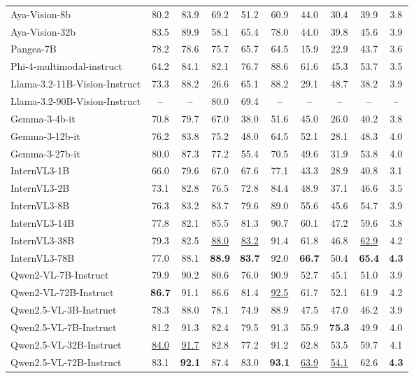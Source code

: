 \begin{table*}[t]
\begin{adjustbox}{max width=\linewidth}
\begin{tabular}{lccccccccc}
Aya-Vision-8b & 80.2 & 83.9 & 69.2 & 51.2 & 60.9 & 44.0 & 30.4 & 39.9 & 3.8 \\
Aya-Vision-32b & 83.5 & 89.9 & 58.1 & 65.4 & 78.0 & 44.0 & 39.8 & 45.6 & 3.9 \\
Pangea-7B & 78.2 & 78.6 & 75.7 & 65.7 & 64.5 & 15.9 & 22.9 & 43.7 & 3.6 \\
Phi-4-multimodal-instruct & 64.2 & 84.1 & 82.1 & 76.7 & 88.6 & 61.6 & 45.3 & 53.7 & 3.5 \\
Llama-3.2-11B-Vision-Instruct & 73.3 & 88.2 & 26.6 & 65.1 & 88.2 & 29.1 & 48.7 & 38.2 & 3.9 \\
Llama-3.2-90B-Vision-Instruct & -- & -- & 80.0 & 69.4 & -- & -- & -- & -- & -- \\
Gemma-3-4b-it & 70.8 & 79.7 & 67.0 & 38.0 & 51.6 & 45.0 & 26.0 & 40.2 & 3.8 \\
Gemma-3-12b-it & 76.2 & 83.8 & 75.2 & 48.0 & 64.5 & 52.1 & 28.1 & 48.3 & 4.0 \\
Gemma-3-27b-it & 80.0 & 87.3 & 77.2 & 55.4 & 70.5 & 49.6 & 31.9 & 53.8 & 4.0 \\
InternVL3-1B & 66.0 & 79.6 & 67.0 & 67.6 & 77.1 & 43.3 & 28.9 & 40.8 & 3.1 \\
InternVL3-2B & 73.1 & 82.8 & 76.5 & 72.8 & 84.4 & 48.9 & 37.1 & 46.6 & 3.5 \\
InternVL3-8B & 76.3 & 83.2 & 83.7 & 79.6 & 89.0 & 55.6 & 45.6 & 54.7 & 3.9 \\
InternVL3-14B & 77.8 & 82.1 & 85.5 & 81.3 & 90.7 & 60.1 & 47.2 & 59.6 & 3.8 \\
InternVL3-38B & 79.3 & 82.5 & \underline{88.0} & \underline{83.2} & 91.4 & 61.8 & 46.8 & \underline{62.9} & 4.2 \\
InternVL3-78B & 77.0 & 88.1 & \textbf{88.9} & \textbf{83.7} & 92.0 & \textbf{66.7} & 50.4 & \textbf{65.4} & \textbf{4.3} \\
Qwen2-VL-7B-Instruct & 79.9 & 90.2 & 80.6 & 76.0 & 90.9 & 52.7 & 45.1 & 51.0 & 3.9 \\
Qwen2-VL-72B-Instruct & \textbf{86.7} & 91.1 & 86.6 & 81.4 & \underline{92.5} & 61.7 & 52.1 & 61.9 & 4.2 \\
Qwen2.5-VL-3B-Instruct & 78.3 & 88.0 & 78.1 & 74.9 & 88.9 & 47.5 & 47.0 & 46.2 & 3.9 \\
Qwen2.5-VL-7B-Instruct & 81.2 & 91.3 & 82.4 & 79.5 & 91.3 & 55.9 & \textbf{75.3} & 49.9 & 4.0 \\
Qwen2.5-VL-32B-Instruct & \underline{84.0} & \underline{91.7} & 82.8 & 77.2 & 91.2 & 62.8 & 53.5 & 59.7 & 4.1 \\
Qwen2.5-VL-72B-Instruct & 83.1 & \textbf{92.1} & 87.4 & 83.0 & \textbf{93.1} & \underline{63.9} & \underline{54.1} & 62.6 & \textbf{4.3} \\
\bottomrule
\end{tabular}
\end{adjustbox}
\end{table*}
\endgroup